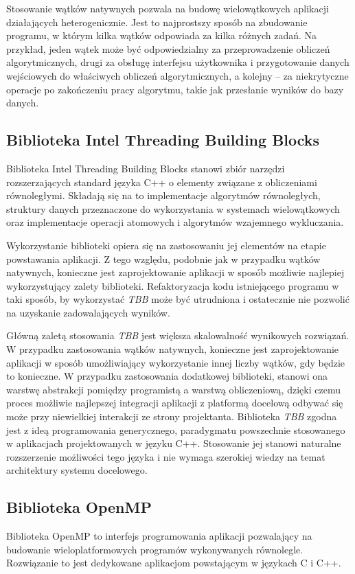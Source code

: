Stosowanie wątków natywnych pozwala na budowę wielowątkowych aplikacji działających heterogenicznie. Jest to najprostszy sposób na zbudowanie programu, w którym kilka wątków odpowiada za kilka różnych zadań. Na przykład, jeden wątek może być odpowiedzialny za przeprowadzenie obliczeń algorytmicznych, drugi za obsługę interfejsu użytkownika i przygotowanie danych wejściowych do właściwych obliczeń algorytmicznych, a kolejny -- za niekrytyczne operacje po zakończeniu pracy algorytmu, takie jak przesłanie wyników do bazy danych.

\subsection{Biblioteka Intel Threading Building Blocks}

Biblioteka Intel Threading Building Blocks stanowi zbiór narzędzi rozszerzających standard języka C++ o elementy związane z obliczeniami równoległymi. Składają się na to implementacje algorytmów równoległych, struktury danych przeznaczone do wykorzystania w systemach wielowątkowych oraz implementacje operacji atomowych i algorytmów wzajemnego wykluczania. \cite{Reinders2010}

Wykorzystanie biblioteki opiera się na zastosowaniu jej elementów na etapie powstawania aplikacji. Z tego względu, podobnie jak w przypadku wątków natywnych, konieczne jest zaprojektowanie aplikacji w sposób możliwie najlepiej wykorzystujący zalety biblioteki. Refaktoryzacja kodu istniejącego programu w taki sposób, by wykorzystać \emph{TBB} może być utrudniona i ostatecznie nie pozwolić na uzyskanie zadowalających wyników.

Główną zaletą stosowania \emph{TBB} jest większa skalowalność wynikowych rozwiązań. W przypadku zastosowania wątków natywnych, konieczne jest zaprojektowanie aplikacji w sposób umożliwiający wykorzystanie innej liczby wątków, gdy będzie to konieczne. W przypadku zastosowania dodatkowej biblioteki, stanowi ona warstwę abstrakcji pomiędzy programistą a warstwą obliczeniową, dzięki czemu proces możliwie najlepszej integracji aplikacji z platformą docelową odbywać się może przy niewielkiej interakcji ze strony projektanta.
Biblioteka \emph{TBB} zgodna jest z ideą programowania generycznego, paradygmatu powszechnie stosowanego w aplikacjach projektowanych w języku C++. Stosowanie jej stanowi naturalne rozszerzenie możliwości tego języka i nie wymaga szerokiej wiedzy na temat architektury systemu docelowego.

\subsection{Biblioteka OpenMP}
Biblioteka OpenMP to interfejs programowania aplikacji pozwalający na budowanie wieloplatformowych programów wykonywanych równolegle. Rozwiązanie to jest dedykowane aplikacjom powstającym w językach C i C++. \cite{openmp-guide}

